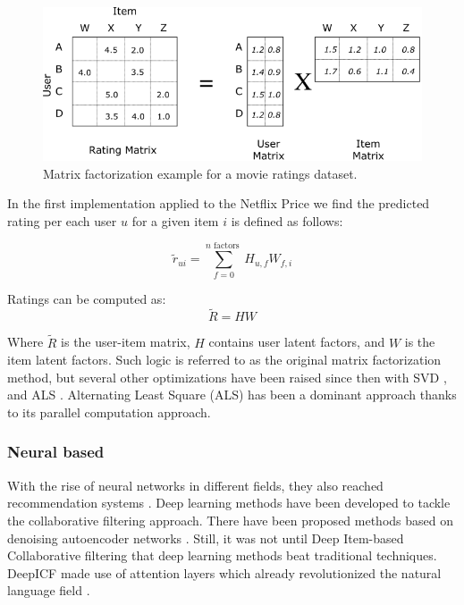 \documentclass{tex_files/kththesis}
\begin{document}
\begin{figure}[H]
    \centering
    \includegraphics[width=\textwidth]{images/background/matrix_factorization.png}
    \caption{Matrix factorization example for a movie ratings dataset.}
\end{figure}

In the first implementation applied to the Netflix Price \cite{matrixvanilla} we find the predicted rating per each user $u$ for a given item $i$ is defined as follows:

\begin{equation}
    \tilde{r}_{u i}=\sum_{f=0}^{n \text { factors }} H_{u, f} W_{f, i}
\end{equation}

Ratings can be computed as:
\begin{equation}
    \tilde{R}=H W
\end{equation}

Where $\tilde{R}$ is the user-item matrix, $H$ contains user latent factors, and $W$ is the item latent factors. Such logic is referred to as the original matrix factorization method, but several other optimizations have been raised since then with SVD \cite{svd}, and ALS \cite{alsnetflix}. Alternating Least Square (ALS) has been a dominant approach thanks to its parallel computation approach.


\subsubsection{Neural based}
With the rise of neural networks in different fields, they also reached recommendation systems \cite{neuralonrecommendations}. Deep learning methods have been developed to tackle the collaborative filtering approach. There have been proposed methods based on denoising autoencoder networks \cite{wang2015collaborative}. Still, it was not until Deep Item-based Collaborative filtering \cite{deepicf} that deep learning methods beat traditional techniques. DeepICF made use of attention layers which already revolutionized the natural language field \cite{attention}. 
\end{document}
